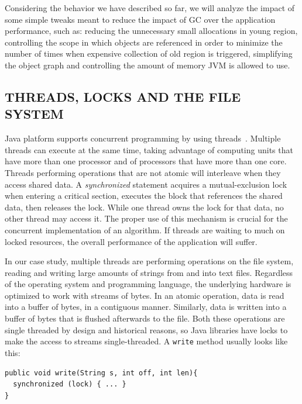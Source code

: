 \documentclass[a4paper,twoside]{article}
\begin{document}
Considering the behavior we have described so far, we will analyze the impact of some simple tweaks
meant to reduce the impact of GC over the application performance, such as:
reducing the unnecessary small allocations in young region, controlling the scope in which objects are referenced in order to minimize the number of times when expensive collection of old region is triggered, simplifying the object graph and controlling the amount of memory JVM is allowed to use.


\subsection{\uppercase{Threads, Locks and the File System}}\label{subsec:uppercase13}

Java platform supports concurrent programming by using threads~\cite{gosling:2014}.
Multiple threads can execute at the same time, taking advantage of computing units that have more than one processor and of processors that have more than one core.
Threads performing operations that are not atomic will interleave when they access shared data.
A {\textit{synchronized} } statement acquires a mutual-exclusion lock when entering a critical section, executes the block that references the shared data, then releases the lock.
While one thread owns the lock for that data, no other thread may access it. 
The proper use of this mechanism is crucial for the concurrent implementation of an algorithm.
If threads are waiting to much on locked resources, the overall performance of the application will suffer.

In our case study, multiple threads are performing operations on the file system, reading and writing large amounts of strings from and into text files.
Regardless of the operating system and programming language, the underlying hardware is optimized to work with streams of bytes.
In an atomic operation, data is read into a buffer of bytes, in a contiguous manner.
Similarly, data is written into a buffer of bytes that is flushed afterwards to the file.
Both these operations are single threaded by design and historical reasons, so Java libraries have locks to make the access to streams single-threaded.
A \texttt{write} method usually looks like this:
\begin{small}
\begin{verbatim}
public void write(String s, int off, int len){
  synchronized (lock) { ... }
}
\end{verbatim}
\end{small}
\end{document}
